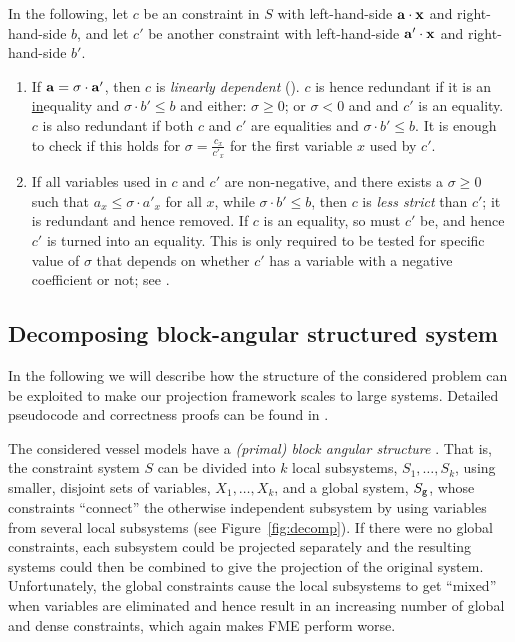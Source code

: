In the following, let $c$ be an constraint in $S$ with left-hand-side $\mathbf{a}\cdot \mathbf{x}$ and right-hand-side $b$, and let $c'$ be another constraint with left-hand-side $\mathbf{a}'\cdot \mathbf{x}$ and right-hand-side $b'$. 
\begin{enumerate} \itemsep0em
\setcounter{enumi}{\value{counterName}}
\item 
If $\mathbf{a}=\sigma\cdot \mathbf{a}'$, then $c$ is \emph{linearly dependent} (\cite{lassez93}). $c$ is hence redundant if
it is an \underline{in}equality and $\sigma\cdot b'\leq b$ and either: $\sigma\geq 0$; or $\sigma<0$ and and $c'$ is an equality. $c$ is also redundant if both $c$ and $c'$ are equalities and $\sigma\cdot b'\leq b$. 
It is enough to check if this holds for $\sigma = \frac{c_x}{c'_x}$ for the first variable $x$ used by $c'$.
\item
If all variables used in $c$ and $c'$ are non-negative, and there exists a $\sigma\geq 0$ such that $a_x \leq \sigma \cdot a'_x$ for all $x$, while $\sigma\cdot b' \leq b$, then $c$ is \emph{less strict} than $c'$; it is redundant and hence removed. If $c$ is an equality, so must $c'$ be, and hence $c'$ is turned into an equality. 
This is only required to be tested for specific value of $\sigma$ that depends on whether $c'$ has a variable with a negative coefficient or not; see \cite{MyTechRep}.
\end{enumerate} 

\subsection{Decomposing block-angular structured system}
\label{sec:decomp}
In the following we will describe how the structure of the considered problem can be exploited to make our projection framework scales to large systems. Detailed pseudocode and correctness proofs can be found in \cite{MyTechRep}. 

The considered vessel models have a \emph{(primal) block angular structure} \cite{williams}. That is, the constraint system $S$ can be divided into $k$ local subsystems, $S_1, \ldots, S_k$, using smaller, disjoint sets of variables, $X_1, \ldots, X_k$, and a global system, $S_{\texttt{g}}$, whose constraints ``connect'' the otherwise independent subsystem by using variables from several local subsystems (see Figure~\ref{fig:decomp}). 
%
If there were no global constraints, each subsystem could be projected separately and the resulting systems could then be combined to give the projection of the original system. 
Unfortunately, the global constraints cause the local subsystems to get ``mixed'' when variables are eliminated and hence result in an increasing number of global and dense constraints, which again makes FME perform worse.

